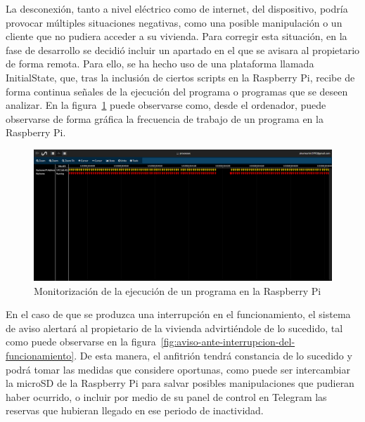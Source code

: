 La desconexión, tanto a nivel eléctrico como de internet, del dispositivo, podría provocar múltiples situaciones negativas, como una posible manipulación o un cliente que no pudiera acceder a su vivienda. Para corregir esta situación, en la fase de desarrollo se decidió incluir un apartado en el que se avisara al propietario de forma remota. Para ello, se ha hecho uso de una plataforma llamada InitialState, que, tras la inclusión de ciertos scripts en la Raspberry Pi, recibe de forma continua señales de la ejecución del programa o programas que se deseen analizar. En la figura~\ref{fig:monitorizacion} puede observarse como, desde el ordenador, puede observarse de forma gráfica la frecuencia de trabajo de un programa en la Raspberry Pi.

\begin{figure}[tbp]
\centering
\includegraphics[scale=0.4]{fig/Monitorizacion.PNG}
\caption{Monitorización de la ejecución de un programa en la Raspberry Pi}
\label{fig:monitorizacion}
\end{figure}

En el caso de que se produzca una interrupción en el funcionamiento, el sistema de aviso alertará al propietario de la vivienda advirtiéndole de lo sucedido, tal como puede observarse en la figura~\ref{fig:aviso-ante-interrupcion-del-funcionamiento}. De esta manera, el anfitrión tendrá constancia de lo sucedido y podrá tomar las medidas que considere oportunas, como puede ser intercambiar la microSD de la Raspberry Pi para salvar posibles manipulaciones que pudieran haber ocurrido, o incluir por medio de su panel de control en Telegram las reservas que hubieran llegado en ese periodo de inactividad.

